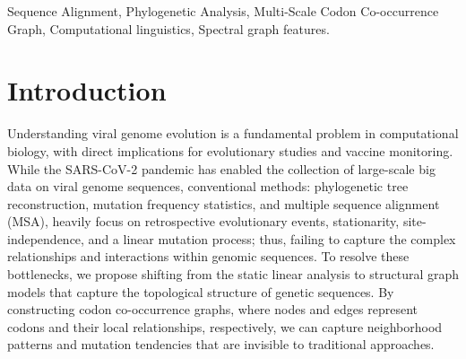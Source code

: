 \documentclass[conference]{IEEEtran}
\begin{document}
\begin{abstract}
Genomic analysis on viruses such as SARS-CoV-2 variants: Beta, Gamma, Delta, and Omicron is heavily dominated by classical bioinformatics methods, including Sequence Alignment, Phylogenetic Analysis, and Mutation Frequency Statistics. These approaches use pairwise codon or nucleotide distance matrices to analyze gene sequences, treating them as linear strings rather than capturing their complex contextual interdependencies. We proposed GenEx, a pipeline that converts raw gene sequences into codon co-occurrence graphs and extracts more than 25 graph features. Our two most prominent techniques for graph generation and feature extraction are MSCG (Multi-Scale Codon Co-occurrence Graph) and LAPCG (Linear-time Adjacency PMI Codon Graph). Using these algorithms, we treated codon sequences as structured symbolic vocabularies interpretable to codon co-occurrence graph analysis, a representational paradigm borrowed from computational linguistics. Another major contribution includes implementing a spectral graph feature extraction using Singular Value Decomposition (SVD), using the squared singular value ($\sigma^2$) instead of the traditionally used eigenvalue, which helped us to amplify the separation between dominant and subdominant spectral components, thereby enhancing inter-class separability in downstream classification.  And to further demonstrate that our method works, we trained 23 benchmarked ML models against the latest SARS-CoV-2 variants, achieving remarkable results in detecting all SARS-CoV-2 variants.
\end{abstract}

\begin{IEEEkeywords}
Sequence Alignment, Phylogenetic Analysis, Multi-Scale Codon Co-occurrence Graph, Computational linguistics, Spectral graph features.
\end{IEEEkeywords}

\section{Introduction}
\label{sec:intro}
Understanding viral genome evolution is a fundamental problem in computational biology, with direct implications for evolutionary studies and vaccine monitoring. While the SARS-CoV-2 pandemic has enabled the collection of large-scale big data on viral genome sequences, conventional methods: phylogenetic tree reconstruction, mutation frequency statistics, and multiple sequence alignment (MSA), heavily focus on retrospective evolutionary events, stationarity, site-independence, and a linear mutation process; thus, failing to capture the complex relationships and interactions within genomic sequences. To resolve these bottlenecks, we propose shifting from the static linear analysis to structural graph models that capture the topological structure of genetic sequences. By constructing codon co-occurrence graphs, where nodes and edges represent codons and their local relationships, respectively, we can capture neighborhood patterns and mutation tendencies that are invisible to traditional approaches. 
\end{document}
